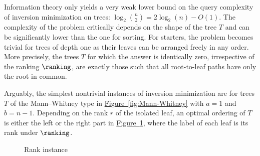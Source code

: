 \documentclass[11pt]{article}
\numberwithin{equation}{section}
\theoremstyle{definition}
\theoremstyle{plain}
\newcommand{\expref}[2]{\hyperref[#2]{#1~\ref{#2}}}
\begin{document}
Information theory only yields a very weak lower bound on the query complexity of inversion minimization on trees: $\log_2 \binom{n}{2} = 2 \log_2(n) - O(1)$. The complexity of the problem critically depends on the shape of the tree $T$ and can be significantly lower than the one for sorting. For starters, the problem becomes trivial for trees of depth one as their leaves can be arranged freely in any order. More precisely, the trees $T$ for which the answer is identically zero, irrespective of the ranking $\ranking$, are exactly those such that all root-to-leaf paths have only the root in common. 

Arguably, the simplest nontrivial instances of inversion minimization are for trees $T$ of the Mann--Whitney type in \expref{Figure}{fig:Mann-Whitney} with $a=1$ and $b=n-1$. Depending on the rank $r$ of the isolated leaf, an optimal ordering of $T$ is either the left or the right part in \expref{Figure}{fig:simplest-non-trivial}, where the label of each leaf is its rank under $\ranking$.

\begin{figure}[ht]
\centering
    \hspace{0.75in}
\caption{Rank instance}\label{fig:simplest-non-trivial}
\end{figure}
\end{document}
